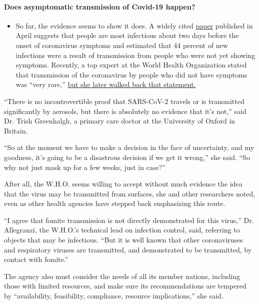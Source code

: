 \begin{itemize}
{  \paragraph{Does asymptomatic transmission of Covid-19
  happen?}\label{does-asymptomatic-transmission-of-covid-19-happen}}

  \begin{itemize}
  \tightlist
  \item
    So far, the evidence seems to show it does. A widely cited
    \href{https://www.nature.com/articles/s41591-020-0869-5}{paper}
    published in April suggests that people are most infectious about
    two days before the onset of coronavirus symptoms and estimated that
    44 percent of new infections were a result of transmission from
    people who were not yet showing symptoms. Recently, a top expert at
    the World Health Organization stated that transmission of the
    coronavirus by people who did not have symptoms was ``very rare,''
    \href{https://www.nytimes.com/2020/06/09/world/coronavirus-updates.html?action=click\&pgtype=Article\&state=default\&region=MAIN_CONTENT_3\&context=storylines_faq\#link-1f302e21}{but
    she later walked back that statement.}
  \end{itemize}
\end{itemize}

``There is no incontrovertible proof that SARS-CoV-2 travels or is
transmitted significantly by aerosols, but there is absolutely no
evidence that it's not,'' said Dr. Trish Greenhalgh, a primary care
doctor at the University of Oxford in Britain.

``So at the moment we have to make a decision in the face of
uncertainty, and my goodness, it's going to be a disastrous decision if
we get it wrong,'' she said. ``So why not just mask up for a few weeks,
just in case?''

After all, the W.H.O. seems willing to accept without much evidence the
idea that the virus may be transmitted from surfaces, she and other
researchers noted, even as other health agencies have stepped back
emphasizing this route.

``I agree that fomite transmission is not directly demonstrated for this
virus,'' Dr. Allegranzi, the W.H.O.'s technical lead on infection
control, said, referring to objects that may be infectious. ``But it is
well known that other coronaviruses and respiratory viruses are
transmitted, and demonstrated to be transmitted, by contact with
fomite.''

The agency also must consider the needs of all its member nations,
including those with limited resources, and make sure its
recommendations are tempered by ``availability, feasibility, compliance,
resource implications,'' she said.

